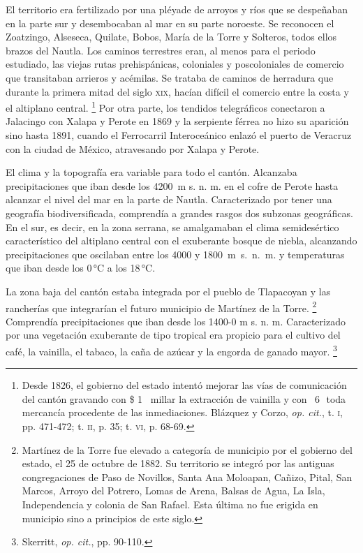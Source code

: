 \documentclass[14pt,twoside,final]{extbook} %
\let\oldfootnote\footnote
\renewcommand\footnote[1]{%
\oldfootnote{\hspace{1mm}#1}}
\begin{document}
El territorio era fertilizado por una pléyade de arroyos y ríos que se despeñaban en la parte sur y desembocaban al mar en su parte noroeste. Se reconocen el Zoatzingo, Alseseca, Quilate, Bobos, María de la Torre y Solteros, todos ellos brazos del Nautla. Los caminos terrestres eran, al menos para el periodo estudiado, las viejas rutas prehispánicas, coloniales y poscoloniales de comercio que transitaban arrieros y acémilas. Se trataba de caminos de herradura que durante la primera mitad del siglo \textsc{xix}, hacían difícil el comercio entre la costa y el altiplano central.\footnote{Desde 1826, el gobierno del estado intentó mejorar las vías de comunicación del cantón gravando con \$ 1 \texttimes\ millar la extracción de vainilla y con \textcent\ 6\,\textonequarter\ toda mercancía procedente de las inmediaciones. Blázquez y Corzo, \emph{op. cit.}, t. \textsc{i}, pp. 471-472; t. \textsc{ii}, p. 35; t. \textsc{vi}, p. 68-69.} Por otra parte, los tendidos telegráficos conectaron a Jalacingo con Xalapa y Perote en 1869 y la serpiente férrea no hizo su aparición sino hasta 1891, cuando el Ferrocarril Interoceánico enlazó el puerto de Veracruz con la ciudad de México, atravesando por Xalapa y Perote.

El clima y la topografía era variable para todo el cantón. Alcanzaba precipitaciones que iban desde los 4200~m s. n. m. en el cofre de Perote hasta alcanzar el nivel del mar en la parte de Nautla. Caracterizado por tener una geografía biodiversificada, comprendía a grandes rasgos dos subzonas geográficas. En el sur, es decir, en la zona serrana, se amalgamaban el clima semidesértico característico del altiplano central con el exuberante bosque de niebla, alcanzando precipitaciones que oscilaban entre los 4000 y \mbox{1800 m s. n. m.} y temperaturas que iban desde los 0\,°C a los 18\,°C.

La zona baja del cantón estaba integrada por el pueblo de Tlapacoyan y las rancherías que integrarían el futuro municipio de Martínez de la Torre.\footnote{Martínez de la Torre fue elevado a categoría de municipio por el gobierno del estado, el 25 de octubre de 1882. Su territorio se integró por las antiguas congregaciones de Paso de Novillos, Santa Ana Moloapan, Cañizo, Pital, San Marcos, Arroyo del Potrero, Lomas de Arena, Balsas de Agua, La Isla, Independencia y colonia de San Rafael. Esta última no fue erigida en municipio sino a principios de este siglo.} Comprendía precipitaciones que iban desde los 1400-0 m s. n. m. Caracterizado por una vegetación exuberante de tipo tropical era propicio para el cultivo del café, la vainilla, el tabaco, la caña de azúcar y la engorda de ganado mayor.\footnote{Skerritt, \emph{op. cit.}, pp. 90-110.}
\end{document}
